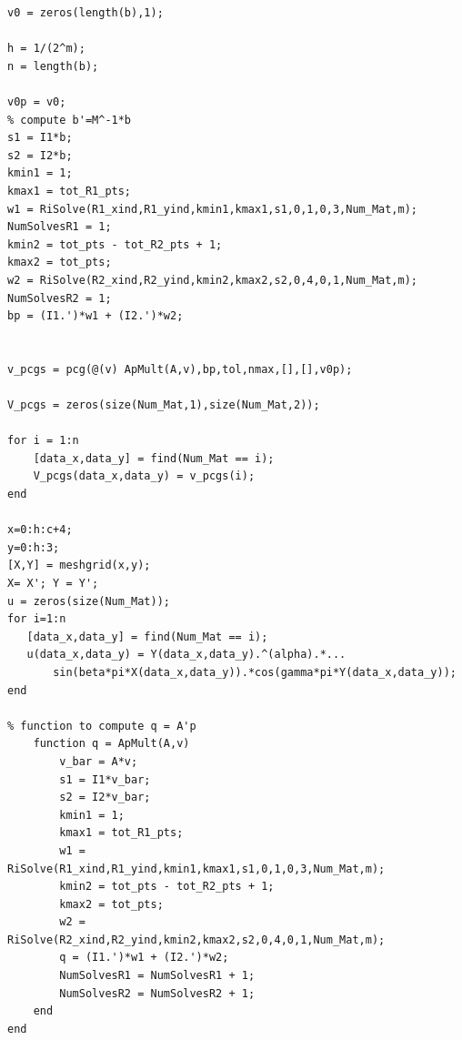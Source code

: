 \documentclass[12pt]{article}
\begin{document}
\begin{itemize}
\begin{lstlisting}[caption=CG Method with Additive Schwarz Preconditioner]
v0 = zeros(length(b),1);

h = 1/(2^m);
n = length(b);

v0p = v0;
% compute b'=M^-1*b
s1 = I1*b;
s2 = I2*b;
kmin1 = 1;
kmax1 = tot_R1_pts;
w1 = RiSolve(R1_xind,R1_yind,kmin1,kmax1,s1,0,1,0,3,Num_Mat,m);
NumSolvesR1 = 1;
kmin2 = tot_pts - tot_R2_pts + 1;
kmax2 = tot_pts;
w2 = RiSolve(R2_xind,R2_yind,kmin2,kmax2,s2,0,4,0,1,Num_Mat,m);
NumSolvesR2 = 1;
bp = (I1.')*w1 + (I2.')*w2;


v_pcgs = pcg(@(v) ApMult(A,v),bp,tol,nmax,[],[],v0p);

V_pcgs = zeros(size(Num_Mat,1),size(Num_Mat,2));

for i = 1:n
    [data_x,data_y] = find(Num_Mat == i);
    V_pcgs(data_x,data_y) = v_pcgs(i); 
end

x=0:h:c+4;
y=0:h:3;
[X,Y] = meshgrid(x,y);
X= X'; Y = Y';
u = zeros(size(Num_Mat));
for i=1:n
   [data_x,data_y] = find(Num_Mat == i);
   u(data_x,data_y) = Y(data_x,data_y).^(alpha).*...
       sin(beta*pi*X(data_x,data_y)).*cos(gamma*pi*Y(data_x,data_y));
end

% function to compute q = A'p
    function q = ApMult(A,v)
        v_bar = A*v;
        s1 = I1*v_bar;
        s2 = I2*v_bar;
        kmin1 = 1;
        kmax1 = tot_R1_pts;
        w1 = RiSolve(R1_xind,R1_yind,kmin1,kmax1,s1,0,1,0,3,Num_Mat,m);
        kmin2 = tot_pts - tot_R2_pts + 1;
        kmax2 = tot_pts;
        w2 = RiSolve(R2_xind,R2_yind,kmin2,kmax2,s2,0,4,0,1,Num_Mat,m);
        q = (I1.')*w1 + (I2.')*w2;
        NumSolvesR1 = NumSolvesR1 + 1;
        NumSolvesR2 = NumSolvesR2 + 1;
    end
end
\end{lstlisting}

\end{itemize}


\newpage
\end{document}
